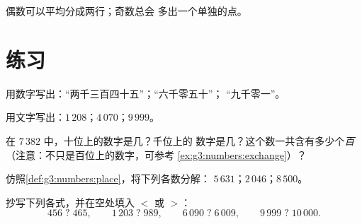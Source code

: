 \begin{omfigure}

{\small 偶数可以平均分成两行；奇数总会
多出一个单独的点。}
\end{omfigure}

\section{练习}

\begin{exercise}[$\star$]\label{exo:g3:numbers:1}
用数字写出：“两千三百四十五”；“六千零五十”；
“九千零一”。
\end{exercise}

\begin{exercise}[$\star$]\label{exo:g3:numbers:2}
用文字写出：$1\,208$；\quad $4\,070$；\quad $9\,999$。
\end{exercise}

\begin{exercise}[$\star$]\label{exo:g3:numbers:3}
在 $7\,382$ 中，十位上的数字是几？千位上的
数字是几？这个数一共含有多少个\emph{百}
（注意：不只是百位上的数字，可参考
\cref{ex:g3:numbers:exchange}）？
\end{exercise}

\begin{exercise}[$\star$]\label{exo:g3:numbers:4}
仿照\cref{def:g3:numbers:place}，将下列各数分解：
$5\,631$；\quad $2\,046$；\quad $8\,500$。
\end{exercise}

\begin{exercise}[$\star$]\label{exo:g3:numbers:5}
抄写下列各式，并在空处填入 $<$ 或 $>$：
\[
456 \;?\; 465, \qquad
1\,203 \;?\; 989, \qquad
6\,090 \;?\; 6\,009, \qquad
9\,999 \;?\; 10\,000 .
\]
\end{exercise}

